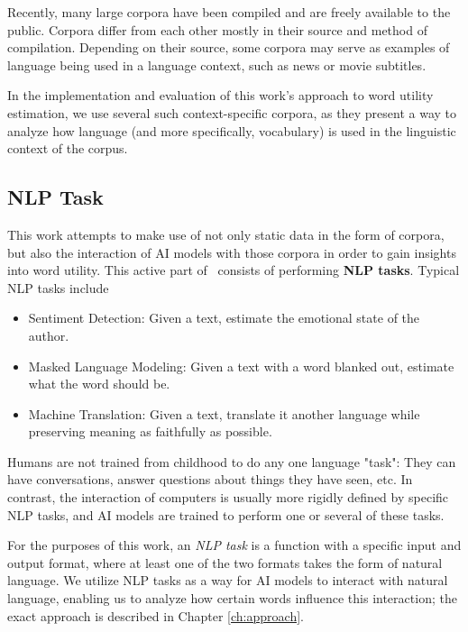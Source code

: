 Recently, many large corpora have been compiled and are freely available to the public.
Corpora differ from each other mostly in their source and method of compilation.
Depending on their source, some corpora may serve as examples of language being used in a language context, such as news or movie subtitles.

In the implementation and evaluation of this work's approach to word utility estimation, we use several such context-specific corpora, as they present a way to analyze how language (and more specifically, vocabulary) is used in the linguistic context of the corpus.

\subsection{NLP Task}
This work attempts to make use of not only static data in the form of corpora, but also the interaction of AI models with those corpora in order to gain insights into word utility.
This active part of \NLP\ consists of performing \textbf{NLP tasks}.
Typical NLP tasks include \cite{jurafskySpeechLanguageProcessing2025}

\begin{itemize}
	\item Sentiment Detection: Given a text, estimate the emotional state of the author.
	\item Masked Language Modeling: Given a text with a word blanked out, estimate what the word should be.
	\item Machine Translation: Given a text, translate it another language while preserving meaning as faithfully as possible.
\end{itemize}

Humans are not trained from childhood to do any one language "task":
They can have conversations, answer questions about things they have seen, etc.
In contrast, the interaction of computers is usually more rigidly defined by specific NLP tasks, and AI models are trained to perform one or several of these tasks.

For the purposes of this work, an \textit{NLP task} is a function with a specific input and output format, where at least one of the two formats takes the form of natural language.
We utilize NLP tasks as a way for AI models to interact with natural language, enabling us to analyze how certain words influence this interaction; the exact approach is described in Chapter \ref{ch:approach}.


